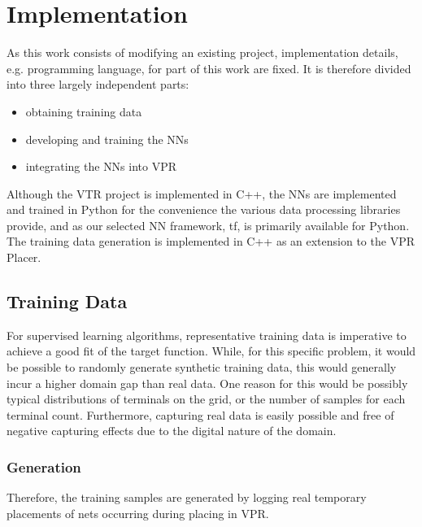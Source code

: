 
\chapter{Implementation}\label{ch:implementation}
\glsresetall %

As this work consists of modifying an existing project, implementation details, e.g. programming language, for part of this work are fixed. It is therefore divided into three largely independent parts:

\begin{itemize}
	\item obtaining training data
	\item developing and training the \glspl{NN}
	\item integrating the \glspl{NN} into \gls{VPR}
\end{itemize}

Although the \gls{VTR} project is implemented in C++, the \glspl{NN} are implemented and trained in Python for the convenience the various data processing libraries provide, and as our selected \gls{NN} framework, \gls{tf}, is primarily available for Python. The training data generation is implemented in C++ as an extension to the \gls{VPR} Placer. 

\section{Training Data}

For supervised learning algorithms, representative training data is imperative to achieve a good fit of the target function. While, for this specific problem, it would be possible to randomly generate synthetic training data, this would generally incur a higher domain gap than real data. One reason for this would be possibly typical distributions of terminals on the grid, or the number of samples for each terminal count. Furthermore, capturing real data is easily possible and free of negative capturing effects due to the digital nature of the domain.

\subsection{Generation}

Therefore, the training samples are generated by logging real temporary placements of nets occurring during placing in \gls{VPR}.

